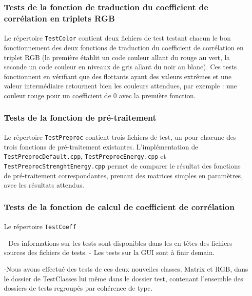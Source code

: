 \subsubsection{Tests de la fonction de traduction du coefficient de corrélation en triplets RGB}
\paragraph{}
Le répertoire \verb!TestColor! contient deux fichiers de test testant
chacun le bon fonctionnement des deux fonctions de traduction du
coefficient de corrélation en triplet RGB (la première établit un code
couleur allant du rouge au vert, la seconde un code couleur en niveaux
de gris allant du noir au blanc). Ces tests fonctionnent en vérifiant
que des flottants ayant des valeurs extrêmes et une valeur
intermédiaire retournent bien les couleurs attendues, par exemple :
une couleur rouge pour un coefficient de 0 avec la première fonction.

\subsubsection{Tests de la fonction de pré-traitement}
\paragraph{}
Le répertoire \verb!TestPreproc! contient trois fichiers de test, un
pour chacune des trois fonctions de pré-traitement
existantes. L'implémentation de \verb!TestPreprocDefault.cpp!,
\verb!TestPreprocEnergy.cpp! et \verb!TestPreprocStrenghtEnergy.cpp!
permet de comparer le résultat des fonctions de pré-traitement
correspondantes, prenant des matrices simples en paramètres, avec les
résultats attendus.

\subsubsection{Tests de la fonction de calcul de coefficient de corrélation}
\paragraph{}
Le répertoire \verb!TestCoeff!


  - Des informations sur les tests sont disponibles dans les en-têtes des
  fichiers sources des fichiers de tests.
  - Les tests sur la GUI sont à finir demain.
  
 -Nous avons effectué des tests de ces deux nouvelles classes, Matrix et RGB,
  dans le dossier de TestClasses lui même dans le dossier test, contenant
  l'ensemble des dossiers de tests regroupés par cohérence de type.
